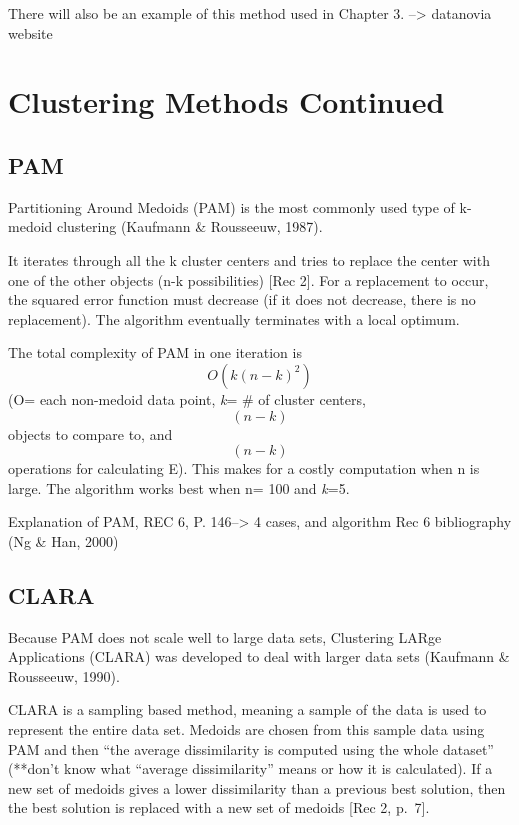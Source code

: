 \documentclass[12pt,twoside]{amherstthesis}
\begin{document}
  There will also be an example of this method used in Chapter 3.
  --\textgreater{} datanovia website
  
  \chapter{Clustering Methods Continued}\label{typeset-equ}
  
  \section{PAM}\label{pam}
  
  Partitioning Around Medoids (PAM) is the most commonly used type of
  k-medoid clustering (Kaufmann \& Rousseeuw, 1987).
  
  It iterates through all the k cluster centers and tries to replace the
  center with one of the other objects (n-k possibilities) {[}Rec 2{]}.
  For a replacement to occur, the squared error function must decrease (if
  it does not decrease, there is no replacement). The algorithm eventually
  terminates with a local optimum.
  
  The total complexity of PAM in one iteration is \[O(k(n-k)^2)\] (O= each
  non-medoid data point, \emph{k}= \# of cluster centers, \[(n-k)\]
  objects to compare to, and \[(n-k)\] operations for calculating E). This
  makes for a costly computation when n is large. The algorithm works best
  when n= 100 and \emph{k}=5.
  
  Explanation of PAM, REC 6, P. 146--\textgreater{} 4 cases, and algorithm
  Rec 6 bibliography (Ng \& Han, 2000)
  
  \section{CLARA}\label{clara}
  
  Because PAM does not scale well to large data sets, Clustering LARge
  Applications (CLARA) was developed to deal with larger data sets
  (Kaufmann \& Rousseeuw, 1990).
  
  CLARA is a sampling based method, meaning a sample of the data is used
  to represent the entire data set. Medoids are chosen from this sample
  data using PAM and then ``the average dissimilarity is computed using
  the whole dataset'' (**don't know what ``average dissimilarity'' means
  or how it is calculated). If a new set of medoids gives a lower
  dissimilarity than a previous best solution, then the best solution is
  replaced with a new set of medoids {[}Rec 2, p.~7{]}.
  
\end{document}
